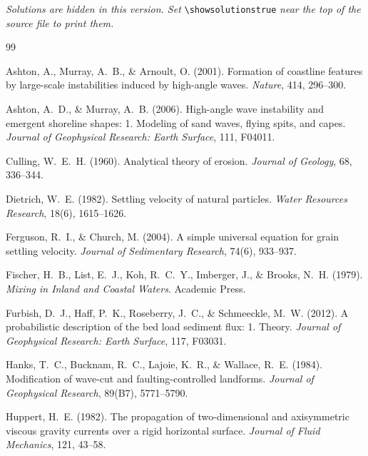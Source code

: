 \documentclass[11pt,letterpaper]{article}
\newif\ifshowsolutions
\numberwithin{equation}{section}
\begin{document}
\else
\noindent\emph{Solutions are hidden in this version. Set} \verb|\showsolutionstrue| \emph{near the top of the source file to print them.}
\fi

\clearpage
{}
{}
\begin{thebibliography}{99}
\small
\setlength{\itemsep}{2pt}

Ashton, A., Murray, A.~B., \& Arnoult, O. (2001). Formation of coastline features by large-scale instabilities induced by
high-angle waves. \emph{Nature}, 414, 296--300.

Ashton, A.~D., \& Murray, A.~B. (2006). High-angle wave instability and emergent shoreline shapes: 1. Modeling of sand waves,
flying spits, and capes. \emph{Journal of Geophysical Research: Earth Surface}, 111, F04011.

Culling, W.~E.~H. (1960). Analytical theory of erosion. \emph{Journal of Geology}, 68, 336--344.

Dietrich, W.~E. (1982). Settling velocity of natural particles. \emph{Water Resources Research}, 18(6), 1615--1626.

Ferguson, R.~I., \& Church, M. (2004). A simple universal equation for grain settling velocity. \emph{Journal of Sedimentary
Research}, 74(6), 933--937.

Fischer, H.~B., List, E.~J., Koh, R.~C.~Y., Imberger, J., \& Brooks, N.~H. (1979). \emph{Mixing in Inland and Coastal Waters}.
Academic Press.

Furbish, D.~J., Haff, P.~K., Roseberry, J.~C., \& Schmeeckle, M.~W. (2012). A probabilistic description of the bed load sediment
flux: 1. Theory. \emph{Journal of Geophysical Research: Earth Surface}, 117, F03031.

Hanks, T.~C., Bucknam, R.~C., Lajoie, K.~R., \& Wallace, R.~E. (1984). Modification of wave-cut and faulting-controlled landforms.
\emph{Journal of Geophysical Research}, 89(B7), 5771--5790.

Huppert, H.~E. (1982). The propagation of two-dimensional and axisymmetric viscous gravity currents over a rigid horizontal
surface. \emph{Journal of Fluid Mechanics}, 121, 43--58.


\end{thebibliography}
\end{document}
